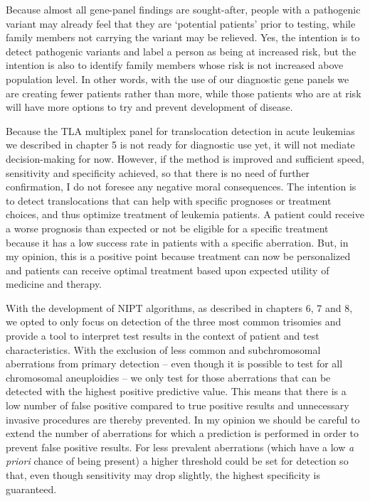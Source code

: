 Because almost all gene-panel findings are sought-after, people with a pathogenic variant may already feel that they are ‘potential patients’ prior to testing, while family members not carrying the variant may be relieved. 
Yes, the intention is to detect pathogenic variants and label a person as being at increased risk, but the intention is also to identify family members whose risk is not increased above population level. 
In other words, with the use of our diagnostic gene panels we are creating fewer patients rather than more, while those patients who are at risk will have more options to try and prevent development of disease. 

Because the TLA multiplex panel for translocation detection in acute leukemias we described in chapter 5 is not ready for diagnostic use yet, it will not mediate decision-making for now. 
However, if the method is improved and sufficient speed, sensitivity and specificity achieved, so that there is no need of further confirmation, I do not foresee any negative moral consequences. 
The intention is to detect translocations that can help with specific prognoses or treatment choices, and thus optimize treatment of leukemia patients. 
A patient could receive a worse prognosis than expected or not be eligible for a specific treatment because it has a low success rate in patients with a specific aberration. 
But, in my opinion, this is a positive point because treatment can now be personalized and patients can receive optimal treatment based upon expected utility of medicine and therapy. 

With the development of NIPT algorithms, as described in chapters 6, 7 and 8, we opted to only focus on detection of the three most common trisomies and provide a tool to interpret test results in the context of patient and test characteristics. 
With the exclusion of less common and subchromosomal aberrations from primary detection – even though it is possible to test for all chromosomal aneuploidies – we only test for those aberrations that can be detected with the highest positive predictive value. 
This means that there is a low number of false positive compared to true positive results and unnecessary invasive procedures are thereby prevented. 
In my opinion we should be careful to extend the number of aberrations for which a prediction is performed in order to prevent false positive results. 
For less prevalent aberrations (which have a low \textsl{a priori} chance of being present) a higher threshold could be set for detection so that, even though sensitivity may drop slightly, the highest specificity is guaranteed.
 
